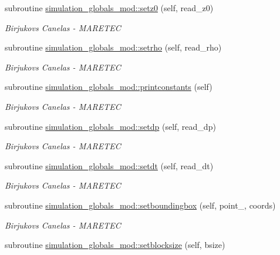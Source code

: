 \begin{DoxyCompactItemize}
subroutine \hyperlink{namespacesimulation__globals__mod_a64b1d91147c1cd5898fec8f23d56a65d}{simulation\+\_\+globals\+\_\+mod\+::setz0} (self, read\+\_\+z0)
\begin{DoxyCompactList}\small\item\em Birjukovs Canelas -\/ M\+A\+R\+E\+T\+EC \end{DoxyCompactList}\item 
subroutine \hyperlink{namespacesimulation__globals__mod_a68a87c39cf88bad353e28e367a721ed4}{simulation\+\_\+globals\+\_\+mod\+::setrho} (self, read\+\_\+rho)
\begin{DoxyCompactList}\small\item\em Birjukovs Canelas -\/ M\+A\+R\+E\+T\+EC \end{DoxyCompactList}\item 
subroutine \hyperlink{namespacesimulation__globals__mod_a20ba28d72a9bea823d9373a94f97026e}{simulation\+\_\+globals\+\_\+mod\+::printconstants} (self)
\begin{DoxyCompactList}\small\item\em Birjukovs Canelas -\/ M\+A\+R\+E\+T\+EC \end{DoxyCompactList}\item 
subroutine \hyperlink{namespacesimulation__globals__mod_acb8e3762572266b40a0deb166dded33a}{simulation\+\_\+globals\+\_\+mod\+::setdp} (self, read\+\_\+dp)
\begin{DoxyCompactList}\small\item\em Birjukovs Canelas -\/ M\+A\+R\+E\+T\+EC \end{DoxyCompactList}\item 
subroutine \hyperlink{namespacesimulation__globals__mod_aecf75eeccef4eeae6d10ab26cf2dcfcf}{simulation\+\_\+globals\+\_\+mod\+::setdt} (self, read\+\_\+dt)
\begin{DoxyCompactList}\small\item\em Birjukovs Canelas -\/ M\+A\+R\+E\+T\+EC \end{DoxyCompactList}\item 
subroutine \hyperlink{namespacesimulation__globals__mod_a412b0779703630189e2ea14e4b390864}{simulation\+\_\+globals\+\_\+mod\+::setboundingbox} (self, point\+\_\+, coords)
\begin{DoxyCompactList}\small\item\em Birjukovs Canelas -\/ M\+A\+R\+E\+T\+EC \end{DoxyCompactList}\item 
subroutine \hyperlink{namespacesimulation__globals__mod_aa65b43534d2d2b6366a4ebc791194805}{simulation\+\_\+globals\+\_\+mod\+::setblocksize} (self, bsize)

\end{DoxyCompactItemize}
